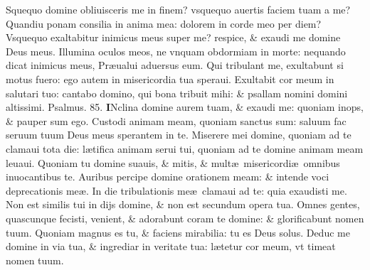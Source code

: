 \documentclass[a5paper,10pt]{book}
\def\ae{æ}
\begin{document}
\begin{multicols*}{2}
Squequo domine obliuisceris me in finem? vsquequo auertis faciem tuam a me?
\newline \color{red} Q\color{black}uandiu ponam consilia in anima mea: dolorem in corde meo per diem?
\newline \color{red} V\color{black}squequo exaltabitur inimicus meus super me? respice, \& exaudi me domine Deus meus.
\newline \color{red} I\color{black}llumina oculos meos, ne vnquam obdormiam in morte: nequando dicat inimicus meus, Pr\ae ualui aduersus eum.
\newline \color{red} Q\color{black}ui tribulant me, exultabunt si motus fuero: ego autem in misericordia tua speraui.
\newline \color{red} E\color{black}xultabit cor meum in salutari tuo: cantabo domino, qui bona tribuit mihi: \& psallam nomini domini altissimi.
\newline \color{red} Psalmus. \hypertarget{ps85}{85.} \color{black}
\vspace{-.5em}
\lettrine[lines=2]{\bfseries \color{red} I}{}Nclina domine aurem tuam, \& exaudi me: quoniam inops, \& pauper sum ego.
\newline \color{red} C\color{black}ustodi animam meam, quoniam sanctus sum: saluum fac seruum tuum Deus meus sperantem in te.
\newline \color{red} M\color{black}iserere mei domine, quoniam ad te clamaui tota die: l\ae tifica animam serui tui, quoniam ad te domine animam meam leuaui.
\newline \color{red} Q\color{black}uoniam tu domine suauis, \& mitis, \& mult\ae \ misericordi\ae \ omnibus inuocantibus te.
\newline \color{red} A\color{black}uribus percipe domine orationem meam: \& intende voci deprecationis me\ae .
\newline \color{red} I\color{black}n die tribulationis me\ae \ clamaui ad te: quia exaudisti me.
\newline \color{red} N\color{black}on est similis tui in dijs domine, \& non est secundum opera tua.
\newline \color{red} O\color{black}mnes gentes, quascunque fecisti, venient, \& adorabunt coram te domine: \& glorificabunt nomen tuum.
\newline \color{red} Q\color{black}uoniam magnus es tu, \& faciens mirabilia: tu es Deus solus.
\newline \color{red} D\color{black}educ me domine in via tua, \& ingrediar in veritate tua: l\ae tetur cor meum, vt timeat nomen tuum.

\end{multicols*}
\end{document}
